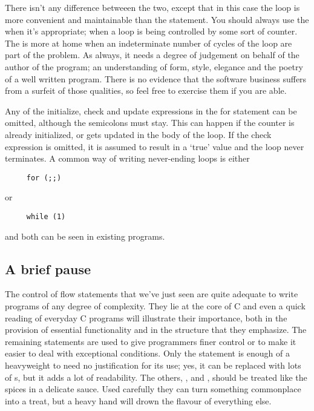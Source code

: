    There isn't any difference betweeen the two, except that in this case
    the \for{} loop is more convenient and maintainable than the
    \while{} statement. You should always use the \for{}
    when it's appropriate; when a loop is being controlled by some sort of
    counter. The \while{} is more at home when an indeterminate
    number of cycles of the loop are part of the problem. As always, it needs
    a degree of judgement on behalf of the author of the program; an
    understanding of form, style, elegance and the poetry of a well written
    program. There is no evidence that the software business suffers from a
    surfeit of those qualities, so feel free to exercise them if you are
    able.


   Any of the initialize, check and update expressions in the for statement
    can be omitted, although the semicolons must stay. This can happen if the
    counter is already initialized, or gets updated in the body of the loop.
    If the check expression is omitted, it is assumed to result in a
    `true' value and the loop never terminates. A common way of writing
    never-ending loops is either


   \begin{Verbatim}
     for (;;)
   \end{Verbatim}

   or


   \begin{Verbatim}
     while (1)
   \end{Verbatim}

   and both can be seen in existing programs.


  

  \subsection{A brief pause }
   

   The control of flow statements that we've just seen are quite adequate
    to write programs of any degree of complexity. They lie at the core
    of C and even a quick reading of everyday C programs will
    illustrate their importance, both in the provision of essential
    functionality and in the structure that they emphasize. The remaining
    statements are used to give programmers finer control or to make it easier
    to deal with exceptional conditions. Only the \switch{}
    statement is enough of a heavyweight to need no justification for its use;
    yes, it can be replaced with lots of \kif{}s, but it adds a lot
    of readability. The others, \kbreak, \continue{} and
    \goto, should be treated like the spices in a delicate sauce.
    Used carefully they can turn something commonplace into a treat, but a
    heavy hand will drown the flavour of everything else.


